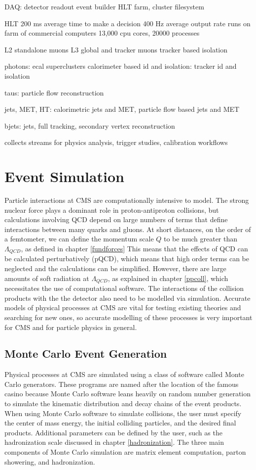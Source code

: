 \documentclass[oneside, letterpaper, oldfontcommands]{memoir}
\begin{document}
DAQ:
detector readout
event builder
HLT farm, cluster filesystem

HLT
200 ms average time to make a decision
400 Hz average output rate
runs on farm of commercial computers
13,000 cpu cores, 20000 processes

L2 standalone muons
L3 global and tracker muons
tracker based isolation

photons: ecal superclusters
calorimeter based id and isolation: tracker id and isolation

taus: particle flow reconstruction

jets, MET, HT: calorimetric jets and MET, particle flow based jets and MET

bjets: jets, full tracking, secondary vertex reconstruction

collects streams for physics analysis, trigger studies, calibration workflows

\chapter{Event Simulation}\label{eventsim}
\qquad Particle interactions at CMS are computationally intensive to model. The strong nuclear force plays a dominant role in proton-antiproton collisions, but calculations involving QCD depend on large numbers of terms 
that define interactions between many quarks and gluons. At short distances, on the order of a femtometer, we can define the momentum scale $Q$ to be much greater than $\Lambda_{QCD}$, as defined in chapter \ref{fundforces}  This means that the effects of QCD can be calculated perturbatively (pQCD), which means that high order terms can be neglected and the calculations can be simplified. However, there are large amounts of soft radiation at $\Lambda_{QCD}$, as explained in chapter \ref{ppcoll}, which necessitates the use of computational software.
\qquad The interactions of the collision products with the the detector also need to be modelled via simulation. Accurate models of physical processes at CMS are vital for testing existing theories and searching for new ones, so accurate modelling of these processes is very important for CMS and for particle physics in general.
   
\section{Monte Carlo Event Generation}\label{mcgen}
\qquad Physical processes at CMS are simulated using a class of software called Monte Carlo generators. These programs are named after the location of the famous casino because Monte Carlo software leans heavily on random number generation to simulate the kinematic distribution and decay chains of the event products. When using Monte Carlo software to simulate collisions, the user must specify the center of mass energy, the initial colliding particles, and the desired final products. Additional parameters can be defined by the user, such as the hadronization scale discussed in chapter \ref{hadronization}.  The three main components of Monte Carlo simulation are matrix element computation, parton showering, and hadronization. 
\end{document}
